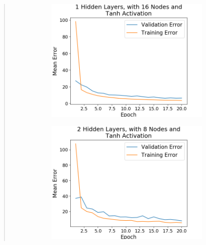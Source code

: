 \documentclass{article}
\begin{document}
\begin{quote}
\begin{figure}[h!]
\begin{subfigure}[h]{0.23\textwidth}
		\includegraphics[width=\textwidth]{figs/Boston_Housing_Regression_1_Hidden_Layers_with_16_Nodes_and_Tanh_Activation.png}
	\end{subfigure}
	\begin{subfigure}[h]{0.23\textwidth}
		\includegraphics[width=\textwidth]{figs/Boston_Housing_Regression_2_Hidden_Layers_with_8_Nodes_and_Tanh_Activation.png}
	\end{subfigure}
	\begin{subfigure}[h]{0.23\textwidth}

\end{subfigure}
\end{figure}
\end{quote}
\end{document}
